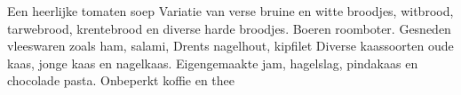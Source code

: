 Een heerlijke tomaten soep
Variatie van verse bruine en witte broodjes, witbrood, tarwebrood, krentebrood en diverse harde broodjes.
Boeren roomboter.
Gesneden vleeswaren zoals ham, salami, Drents nagelhout, kipfilet
Diverse kaassoorten oude kaas, jonge kaas en nagelkaas.
Eigengemaakte jam, hagelslag, pindakaas en chocolade pasta.
Onbeperkt koffie en thee
